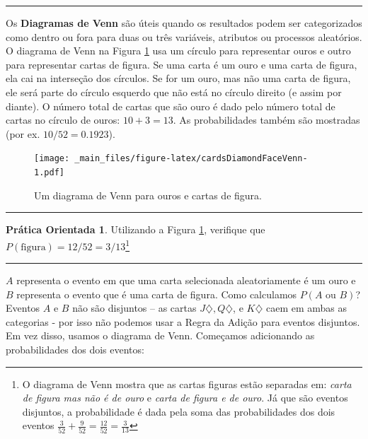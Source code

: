 \documentclass[
]{book}
\theoremstyle{definition}
\theoremstyle{definition}
\theoremstyle{definition}
\newtheorem{exercise}{Prática Orientada}[chapter]
\theoremstyle{definition}
\theoremstyle{remark}
\begin{document}
\begin{center}\rule{0.5\linewidth}{0.5pt}\end{center}

Os \textbf{Diagramas de Venn} são úteis quando os resultados podem ser categorizados como dentro ou fora para duas ou três variáveis, atributos ou processos aleatórios. O diagrama de Venn na Figura \ref{fig:cardsDiamondFaceVenn} usa um círculo para representar ouros e outro para representar cartas de figura. Se uma carta é um ouro e uma carta de figura, ela cai na interseção dos círculos. Se for um ouro, mas não uma carta de figura, ele será parte do círculo esquerdo que não está no círculo direito (e assim por diante). O número total de cartas que são ouro é dado pelo número total de cartas no círculo de ouros: \(10+3=13\). As probabilidades também são mostradas (por ex. \(10/52 = 0.1923\)).

\begin{figure}
\centering
\texttt{[image: \_main\_files/figure-latex/cardsDiamondFaceVenn-1.pdf]}
\caption{\label{fig:cardsDiamondFaceVenn}Um diagrama de Venn para ouros e cartas de figura.}
\end{figure}

\begin{center}\rule{0.5\linewidth}{0.5pt}\end{center}

\begin{exercise}
\protect\hypertarget{exr:unnamed-chunk-48}{}{\label{exr:unnamed-chunk-48} }Utilizando a Figura \ref{fig:cardsDiamondFaceVenn}, verifique que \(P(\text{figura}) = 12/52 = 3/13\)\footnote{O diagrama de Venn mostra que as cartas figuras estão separadas em: \emph{carta de figura mas não é de ouro} e \emph{carta de figura e de ouro}. Já que são eventos disjuntos, a probabilidade é dada pela soma das probabilidades dos dois eventos \(\frac{3}{52} + \frac{9}{52} = \frac{12}{52} = \frac{3}{13}\)}
\end{exercise}

\begin{center}\rule{0.5\linewidth}{0.5pt}\end{center}

\(A\) representa o evento em que uma carta selecionada aleatoriamente é um ouro e \(B\) representa o evento que é uma carta de figura. Como calculamos \(P(A \text{ ou } B)\)? Eventos \(A\) e \(B\) não são disjuntos -- as cartas \(J\diamondsuit, Q\diamondsuit\), e \(K\diamondsuit\) caem em ambas as categorias - por isso não podemos usar a Regra da Adição para eventos disjuntos. Em vez disso, usamos o diagrama de Venn. Começamos adicionando as probabilidades dos dois eventos:
\end{document}

